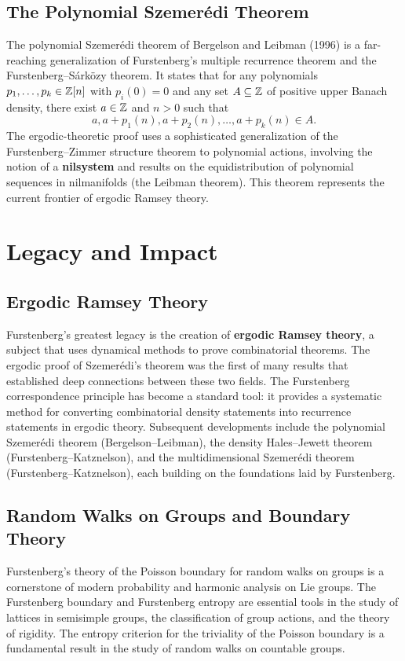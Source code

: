 \subsection{The Polynomial Szemer\'edi Theorem}

The polynomial Szemer\'edi theorem of Bergelson and Leibman (1996) is a far-reaching generalization of Furstenberg's multiple recurrence theorem and the Furstenberg--S\'ark\"ozy theorem. It states that for any polynomials \(p_1,\dots,p_k \in \mathbb{Z}[n]\) with \(p_i(0) = 0\) and any set \(A \subseteq \mathbb{Z}\) of positive upper Banach density, there exist \(a \in \mathbb{Z}\) and \(n > 0\) such that
\[
a, a + p_1(n), a + p_2(n), \dots, a + p_k(n) \in A.
\]
The ergodic-theoretic proof uses a sophisticated generalization of the Furstenberg--Zimmer structure theorem to polynomial actions, involving the notion of a \textbf{nilsystem} and results on the equidistribution of polynomial sequences in nilmanifolds (the Leibman theorem). This theorem represents the current frontier of ergodic Ramsey theory.

\section{Legacy and Impact}

\subsection{Ergodic Ramsey Theory}

Furstenberg's greatest legacy is the creation of \textbf{ergodic Ramsey theory}, a subject that uses dynamical methods to prove combinatorial theorems. The ergodic proof of Szemer\'edi's theorem was the first of many results that established deep connections between these two fields. The Furstenberg correspondence principle has become a standard tool: it provides a systematic method for converting combinatorial density statements into recurrence statements in ergodic theory. Subsequent developments include the polynomial Szemer\'edi theorem (Bergelson--Leibman), the density Hales--Jewett theorem (Furstenberg--Katznelson), and the multidimensional Szemer\'edi theorem (Furstenberg--Katznelson), each building on the foundations laid by Furstenberg.

\subsection{Random Walks on Groups and Boundary Theory}

Furstenberg's theory of the Poisson boundary for random walks on groups is a cornerstone of modern probability and harmonic analysis on Lie groups. The Furstenberg boundary and Furstenberg entropy are essential tools in the study of lattices in semisimple groups, the classification of group actions, and the theory of rigidity. The entropy criterion for the triviality of the Poisson boundary is a fundamental result in the study of random walks on countable groups.

